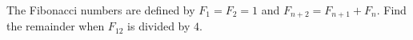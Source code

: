 The Fibonacci numbers are defined by $F_1=F_2=1$ and $F_{n+2}=F_{n+1}+F_n$. Find the remainder when $F_{12}$ is divided by $4$.
